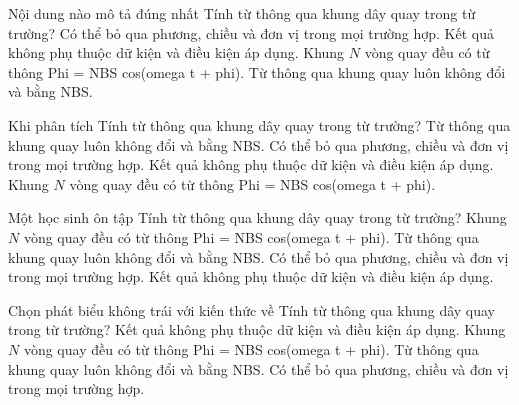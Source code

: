 \begin{ex}
Nội dung nào mô tả đúng nhất Tính từ thông qua khung dây quay trong từ trường?
\choice
{Có thể bỏ qua phương, chiều và đơn vị trong mọi trường hợp.}
{Kết quả không phụ thuộc dữ kiện và điều kiện áp dụng.}
{\True Khung $N$ vòng quay đều có từ thông Phi = NBS cos(omega t + phi).}
{Từ thông qua khung quay luôn không đổi và bằng NBS.}
\end{ex}

\begin{ex}
Khi phân tích Tính từ thông qua khung dây quay trong từ trường?
\choice
{Từ thông qua khung quay luôn không đổi và bằng NBS.}
{Có thể bỏ qua phương, chiều và đơn vị trong mọi trường hợp.}
{Kết quả không phụ thuộc dữ kiện và điều kiện áp dụng.}
{\True Khung $N$ vòng quay đều có từ thông Phi = NBS cos(omega t + phi).}
\end{ex}

\begin{ex}
Một học sinh ôn tập Tính từ thông qua khung dây quay trong từ trường?
\choice
{\True Khung $N$ vòng quay đều có từ thông Phi = NBS cos(omega t + phi).}
{Từ thông qua khung quay luôn không đổi và bằng NBS.}
{Có thể bỏ qua phương, chiều và đơn vị trong mọi trường hợp.}
{Kết quả không phụ thuộc dữ kiện và điều kiện áp dụng.}
\end{ex}

\begin{ex}
Chọn phát biểu không trái với kiến thức về Tính từ thông qua khung dây quay trong từ trường?
\choice
{Kết quả không phụ thuộc dữ kiện và điều kiện áp dụng.}
{\True Khung $N$ vòng quay đều có từ thông Phi = NBS cos(omega t + phi).}
{Từ thông qua khung quay luôn không đổi và bằng NBS.}
{Có thể bỏ qua phương, chiều và đơn vị trong mọi trường hợp.}
\end{ex}

